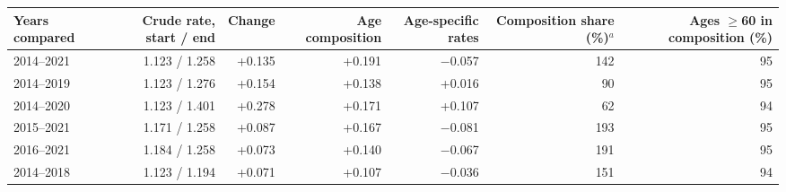 \begin{tabular}{lrrrrrr}
\toprule
Years compared & Crude rate, start / end & Change & Age composition & Age-specific rates & Composition share (\%)$^{a}$ & Ages $\geq$60 in composition (\%) \\
\midrule
2014--2021 & 1.123 / 1.258 & +0.135 & +0.191 & $-$0.057 & 142 & 95 \\
2014--2019 & 1.123 / 1.276 & +0.154 & +0.138 & +0.016 & 90 & 95 \\
2014--2020 & 1.123 / 1.401 & +0.278 & +0.171 & +0.107 & 62 & 94 \\
2015--2021 & 1.171 / 1.258 & +0.087 & +0.167 & $-$0.081 & 193 & 95 \\
2016--2021 & 1.184 / 1.258 & +0.073 & +0.140 & $-$0.067 & 191 & 95 \\
2014--2018 & 1.123 / 1.194 & +0.071 & +0.107 & $-$0.036 & 151 & 94 \\
\bottomrule
\end{tabular}
